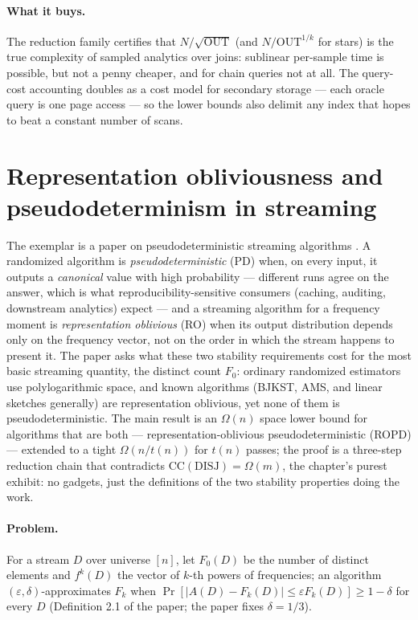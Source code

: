 \paragraph{What it buys.}
The reduction family certifies that $N/\sqrt{\mathrm{OUT}}$ (and
$N/\mathrm{OUT}^{1/k}$ for stars) is the true complexity of sampled analytics over
joins: sublinear per-sample time is possible, but not a penny cheaper, and for chain
queries not at all. The query-cost accounting doubles as a cost model for secondary
storage --- each oracle query is one page access --- so the lower bounds also delimit
any index that hopes to beat a constant number of scans.

\section{Representation obliviousness and pseudodeterminism in streaming}
\label{sec:cc-ropd}

The exemplar is a paper on pseudodeterministic streaming algorithms
\citep{sigmod26-357}. A randomized algorithm is \emph{pseudodeterministic} (PD) when,
on every input, it outputs a \emph{canonical} value with high probability ---
different runs agree on the answer, which is what reproducibility-sensitive consumers
(caching, auditing, downstream analytics) expect --- and a streaming algorithm for a
frequency moment is \emph{representation oblivious} (RO) when its output
distribution depends only on the frequency vector, not on the order in which the
stream happens to present it. The paper asks what these two stability requirements
cost for the most basic streaming quantity, the distinct count $F_0$: ordinary
randomized estimators use polylogarithmic space, and known algorithms (BJKST, AMS,
and linear sketches generally) are representation oblivious, yet none of them is
pseudodeterministic. The main result is an $\Omega(n)$ space lower bound for
algorithms that are both --- representation-oblivious pseudodeterministic (ROPD) ---
extended to a tight $\Omega(n/t(n))$ for $t(n)$ passes; the proof is a three-step
reduction chain that contradicts $\mathrm{CC}(\mathrm{DISJ}) = \Omega(m)$, the
chapter's purest exhibit: no gadgets, just the definitions of the two stability
properties doing the work.

\paragraph{Problem.}
For a stream $D$ over universe $[n]$, let $F_0(D)$ be the number of distinct elements
and $f^k(D)$ the vector of $k$-th powers of frequencies; an algorithm
$(\varepsilon,\delta)$-approximates $F_k$ when
$\Pr[|A(D) - F_k(D)| \le \varepsilon F_k(D)] \ge 1-\delta$ for every $D$
(Definition 2.1 of the paper; the paper fixes $\delta = 1/3$).


